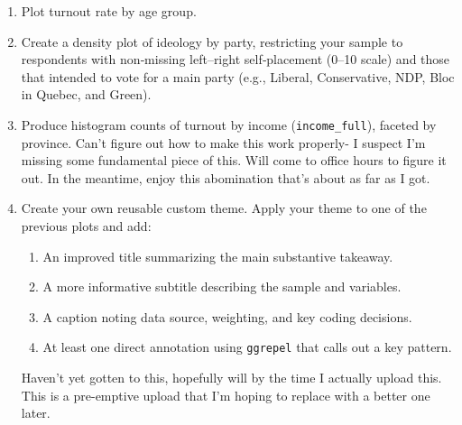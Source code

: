 \documentclass[12pt,letterpaper]{article}
\begin{document}
\begin{enumerate}
	\item Plot turnout rate by age group.
	
	
	\item Create a density plot of ideology by party, restricting your sample to respondents with non‑missing left–right self‑placement (0–10 scale) and those that intended to vote for a main party (e.g., Liberal, Conservative, NDP, Bloc in Quebec, and Green).
	
	
	\item Produce histogram counts of turnout by income (\texttt{income\_full}), faceted by province.
	Can't figure out how to make this work properly- I suspect I'm missing some fundamental piece of this. Will come to office hours to figure it out. In the meantime, enjoy this abomination that's about as far as I got.
	
	
	\item Create your own reusable custom theme. Apply your theme to one of the previous plots and add:
	\begin{enumerate}
		\item An improved title summarizing the main substantive takeaway.
		\item A more informative subtitle describing the sample and variables.
		\item A caption noting data source, weighting, and key coding decisions.
		\item At least one direct annotation using \texttt{ggrepel} that calls out a key pattern.
	\end{enumerate}
	Haven't yet gotten to this, hopefully will by the time I actually upload this. This is a pre-emptive upload that I'm hoping to replace with a better one later.

\end{enumerate}
\end{document}
